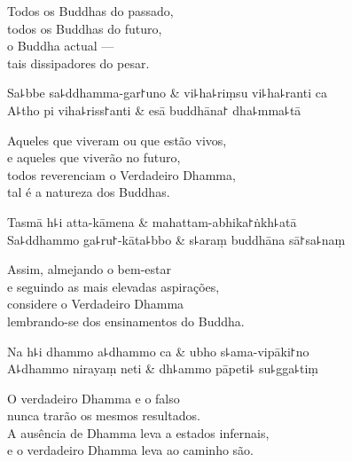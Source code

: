 \begin{english}
  Todos os Buddhas do passado,\\
  todos os Buddhas do futuro,\\
  o Buddha actual ---\\
  tais dissipadores do pesar.
\end{english}

\begin{twochants}
  Sa꜕bbe sa꜕ddhamma-gar꜓uno & vi꜕ha꜕riṃsu vi꜕ha꜕ranti ca \\
  A꜕tho pi viha꜕riss꜓anti & esā buddhāna꜓ dha꜕mma꜕tā \\
\end{twochants}

\begin{english}
  Aqueles que viveram ou que estão vivos,\\
  e aqueles que viverão no futuro,\\
  todos reverenciam o Verdadeiro Dhamma,\\
  tal é a natureza dos Buddhas.
\end{english}

\begin{twochants}
  Tasmā h꜕i atta-kāmena & mahattam-abhika꜓ṅkh꜕atā \\
  Sa꜕ddhammo ga꜕ru꜓-kāta꜕bbo & s꜕araṃ buddhāna sā꜓sa꜕naṃ \\
\end{twochants}

\begin{english}
  Assim, almejando o bem-estar\\
  e seguindo as mais elevadas aspirações,\\
  considere o Verdadeiro Dhamma\\
  lembrando-se dos ensinamentos do Buddha.
\end{english}

\clearpage

\begin{twochants}
  Na h꜕i dhammo a꜕dhammo ca & ubho s꜕ama-vipāki꜓no \\
  A꜕dhammo nirayaṃ neti & dh꜕ammo pāpeti꜕ su꜕gga꜕tiṃ \\
\end{twochants}

\begin{english}
  O verdadeiro Dhamma e o falso\\
  nunca trarão os mesmos resultados.\\
  A ausência de Dhamma leva a estados infernais,\\
  e o verdadeiro Dhamma leva ao caminho são.
\end{english}

